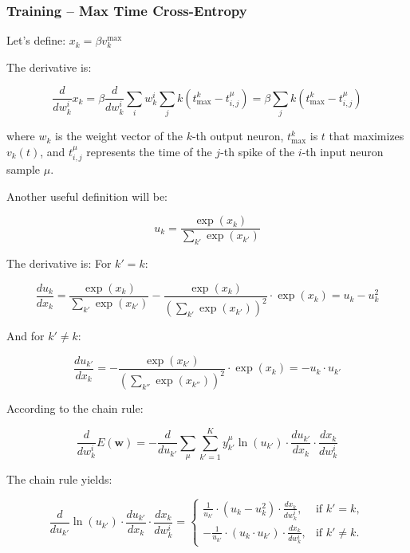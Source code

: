 \subsubsection{Training – Max Time Cross-Entropy}

Let's define: \(x_k = \beta v_k^{\max}\)

The derivative is:

\begin{equation}
    \frac{d}{dw_k^i} x_k = \beta \frac{d}{dw_k^i} \sum_i w_k^i \sum_j k(t_{\max}^k - t_{i,j}^\mu) = \beta \sum_j k(t_{\max}^k - t_{i,j}^\mu)
\end{equation}

where \(w_k\) is the weight vector of the \(k\)-th output neuron, \(t_{\max}^k\) is \(t\) that maximizes \(v_k(t)\), and \(t_{i,j}^\mu\) represents the time of the \(j\)-th spike of the \(i\)-th input neuron sample \(\mu\).

Another useful definition will be:

\begin{equation}
    u_k = \frac{\exp(x_k)}{\sum_{k'} \exp(x_{k'})}
\end{equation}

The derivative is:
For \(k' = k\):

\begin{equation}
    \frac{du_k}{dx_k} = \frac{\exp(x_k)}{\sum_{k'} \exp(x_{k'})} - \frac{\exp(x_k)}{\left(\sum_{k'} \exp(x_{k'})\right)^2} \cdot \exp(x_k) = u_k - u_k^2
\end{equation}

And for \(k' \neq k\):

\begin{equation}
    \frac{du_{k'}}{dx_k} = -\frac{\exp(x_{k'})}{\left(\sum_{k''} \exp(x_{k''})\right)^2} \cdot \exp(x_k) = -u_k \cdot u_{k'}
\end{equation}

According to the chain rule:

\begin{equation}
    \frac{d}{dw_k^i} E(\mathbf{w}) = -\frac{d}{du_{k'}} \sum_\mu \sum_{k'=1}^K y_{k'}^\mu \ln(u_{k'}) \cdot \frac{du_{k'}}{dx_k} \cdot \frac{dx_k}{dw_k^i}
\end{equation}

The chain rule yields:

\begin{equation}
    \frac{d}{du_{k'}} \ln(u_{k'}) \cdot \frac{du_{k'}}{dx_k} \cdot \frac{dx_k}{dw_k^i} = \begin{cases}
    \frac{1}{u_{k'}} \cdot (u_k - u_k^2) \cdot \frac{dx_k}{dw_k^i}, & \text{if } k' = k, \\
    -\frac{1}{u_{k'}} \cdot (u_k \cdot u_{k'}) \cdot \frac{dx_k}{dw_k^i}, & \text{if } k' \neq k.
    \end{cases}
\end{equation}

